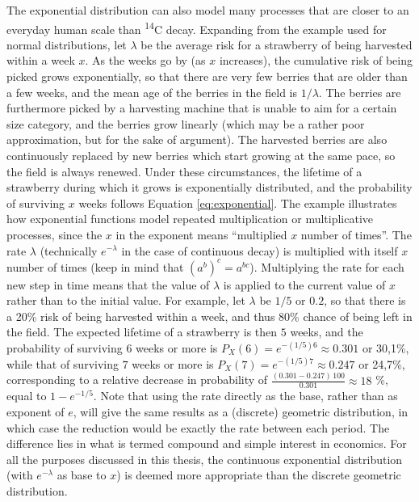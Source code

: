 \documentclass[
  12pt,
]{book}
\begin{document}
The exponential distribution can also model many processes that are closer to an everyday human scale than \textsuperscript{14}C decay. Expanding from the example used for normal distributions, let \(\lambda\) be the average risk for a strawberry of being harvested within a week \(x\). As the weeks go by (as \(x\) increases), the cumulative risk of being picked grows exponentially, so that there are very few berries that are older than a few weeks, and the mean age of the berries in the field is \(1/\lambda\). The berries are furthermore picked by a harvesting machine that is unable to aim for a certain size category, and the berries grow linearly (which may be a rather poor approximation, but for the sake of argument). The harvested berries are also continuously replaced by new berries which start growing at the same pace, so the field is always renewed. Under these circumstances, the lifetime of a strawberry during which it grows is exponentially distributed, and the probability of surviving \(x\) weeks follows Equation \eqref{eq:exponential}. The example illustrates how exponential functions model repeated multiplication or multiplicative processes, since the \(x\) in the exponent means ``multiplied \(x\) number of times''. The rate \(\lambda\) (technically \(e^{-\lambda}\) in the case of continuous decay) is multiplied with itself \(x\) number of times (keep in mind that \((a^b)^c = a^{bc}\)). Multiplying the rate for each new step in time means that the value of \(\lambda\) is applied to the current value of \(x\) rather than to the initial value. For example, let \(\lambda\) be \(1/5\) or \(0.2\), so that there is a 20\% risk of being harvested within a week, and thus 80\% chance of being left in the field. The expected lifetime of a strawberry is then \(5\) weeks, and the probability of surviving \(6\) weeks or more is \(P_X(6) = e^{-(1/5)6} \approx 0.301\) or 30,1\%, while that of surviving \(7\) weeks or more is \(P_X(7) = e^{-(1/5)7} \approx 0.247\) or 24,7\%, corresponding to a relative decrease in probability of \(\frac{(0.301-0.247)\,100}{0.301} \approx 18\) \%, equal to \(1-e^{-1/5}\). Note that using the rate directly as the base, rather than as exponent of \(e\), will give the same results as a (discrete) geometric distribution, in which case the reduction would be exactly the rate between each period. The difference lies in what is termed compound and simple interest in economics. For all the purposes discussed in this thesis, the continuous exponential distribution (with \(e^{-\lambda}\) as base to \(x\)) is deemed more appropriate than the discrete geometric distribution.
\end{document}

